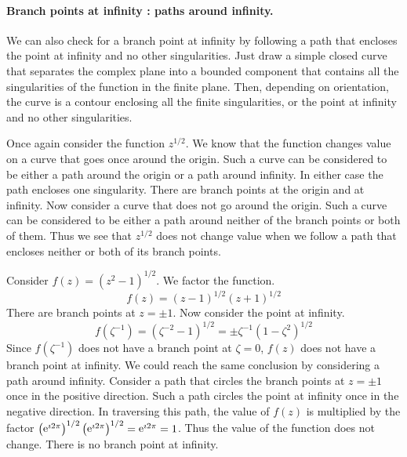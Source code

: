\paragraph{Branch points at infinity : paths around infinity.}
We can also check for a branch point at infinity by following a path
that encloses the point at infinity and no other singularities.  
Just draw a simple closed curve that separates the complex plane into
a bounded component that contains all the singularities of the function
in the finite plane.  Then, depending on orientation, the curve is 
a contour enclosing all the finite singularities, or the point at 
infinity and no other singularities.



\begin{Example}
  Once again consider the function $z^{1/2}$.  We know that the function 
  changes value on a curve that goes once around the origin.  Such a 
  curve can be considered to be either a path around the origin or a path
  around infinity.  In either case the path encloses one singularity.  
  There are branch points at the origin and at infinity.  Now consider 
  a curve that does not go around the origin.  Such a curve can be considered
  to be either a path around neither of the branch points or both of them.
  Thus we see that $z^{1/2}$ does not change value when we follow a path
  that encloses neither or both of its branch points.
\end{Example}








\begin{Example}
  Consider $f(z) = \left( z^2 - 1 \right)^{1/2}$.  We factor the function.
  \[
  f(z) = (z - 1)^{1/2}  (z + 1)^{1/2}
  \]
  There are branch points at $z = \pm1$.  Now consider the point at infinity.
  \[
  f\left( \zeta^{-1} \right) = \left( \zeta^{-2} - 1 \right)^{1/2} 
  = \pm \zeta^{-1}  \left( 1 - \zeta^2 \right)^{1/2}
  \]
  Since $f\left( \zeta^{-1} \right)$ does not have a branch point at $\zeta = 0$, $f(z)$
  does not have a branch point at infinity.  We could reach the same
  conclusion by considering a path around infinity.  Consider a path
  that circles the branch points at $z = \pm1$ once in the positive
  direction.  Such a path circles the point at infinity once in the
  negative direction.  In traversing this path, the value of $f(z)$ is
  multiplied by the factor 
  $\left( \mathop{\mathrm{e}}\nolimits^{\imath 2 \pi} \right)^{1/2}  \left( \mathop{\mathrm{e}}\nolimits^{\imath 2 \pi} \right)^{1/2} = \mathop{\mathrm{e}}\nolimits^{\imath 2 \pi} = 1$.  
  Thus the value of the function does not
  change.  There is no branch point at infinity.
\end{Example}







